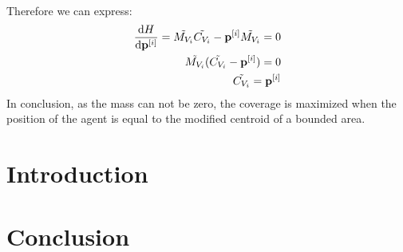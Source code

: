 \\
Therefore we can express:
\begin{align}
    \frac{\mathrm{d}H}{\mathrm{d}\mathbf{p}^{[i]}} = \Tilde{M_{V_i}} \Tilde{C_{V_i}}-\mathbf{p}^{[i]} \Tilde{M_{V_i}} = 0 \\
    \Tilde{M_{V_i}}(\Tilde{C_{V_i}} - \mathbf{p}^{[i]}) = 0 \\
    \Tilde{C_{V_i}} = \mathbf{p}^{[i]}
\end{align}
In conclusion, as the mass can not be zero, the coverage is maximized when the position of the agent is equal to the modified centroid of a bounded area.



\section{Introduction}
\label{sec:introAreaCoverageModeling}

\section{Conclusion}
\label{sec:conclusionAreaCoverageModeling}
